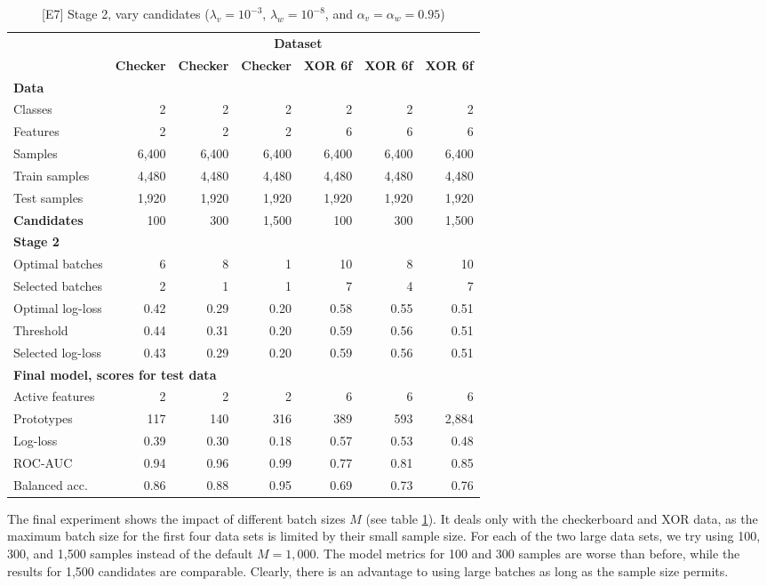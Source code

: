 \begin{table}
\caption{[E7] Stage 2, vary candidates ($\lambda_v=10^{-3}$, $\lambda_w=10^{-8}$, and $\alpha_v=\alpha_w=0.95$)}
\label{tab_e7}
%
\begin{center}
\small
\begin{tabular}{|lrrrrrr|}
\hline
&\multicolumn{6}{c|}{\textbf{\hrulefill\ Dataset \hrulefill}}\\
&\textbf{Checker}&\textbf{Checker}&\textbf{Checker}&\textbf{XOR 6f}&\textbf{XOR 6f}&\textbf{XOR 6f}\\
\multicolumn{7}{|l|}{\textbf{Data}}\\
Classes&2&2&2&2&2&2\\
Features&2&2&2&6&6&6\\
Samples&6,400&6,400&6,400&6,400&6,400&6,400\\
Train samples&4,480&4,480&4,480&4,480&4,480&4,480\\
Test samples&1,920&1,920&1,920&1,920&1,920&1,920\\
\textbf{Candidates}&100&300&1,500&100&300&1,500\\
\multicolumn{7}{|l|}{\textbf{Stage 2}}\\
Optimal batches&6&8&1&10&8&10\\
Selected batches&2&1&1&7&4&7\\
Optimal log-loss&0.42&0.29&0.20&0.58&0.55&0.51\\
Threshold&0.44&0.31&0.20&0.59&0.56&0.51\\
Selected log-loss&0.43&0.29&0.20&0.59&0.56&0.51\\
\multicolumn{7}{|l|}{\textbf{Final model, scores for test data}}\\
Active features&2&2&2&6&6&6\\
Prototypes&117&140&316&389&593&2,884\\
Log-loss&0.39&0.30&0.18&0.57&0.53&0.48\\
ROC-AUC&0.94&0.96&0.99&0.77&0.81&0.85\\
Balanced acc.&0.86&0.88&0.95&0.69&0.73&0.76\\
\hline
\end{tabular}
\end{center}
\end{table}
%
The final experiment shows the impact of different batch sizes $M$ (see table \ref{tab_e7}).
It deals only with the checkerboard and XOR data, as the maximum batch size for the first four data sets is limited by their small sample size.
For each of the two large data sets, we try using 100, 300, and 1,500 samples instead of the default $M=1,000$.
The model metrics for 100 and 300 samples are worse than before, while the results for 1,500 candidates are comparable.
Clearly, there is an advantage to using large batches as long as the sample size permits.
%
\clearpage
%
